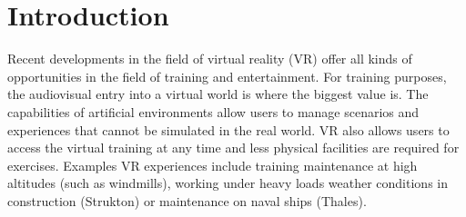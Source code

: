 \section{Introduction}
Recent developments in the field of virtual reality (VR) offer all kinds of opportunities in the field of training
and entertainment. For training purposes, the audiovisual entry into a virtual world is where the biggest value is.
The capabilities of artificial environments allow users to manage scenarios and 
experiences that cannot be simulated in the real world. VR also allows users to access the virtual training at any time
and less physical facilities are required for exercises. 
Examples VR experiences include training maintenance at high altitudes (such as windmills), working under heavy loads
weather conditions in construction (Strukton) or maintenance on naval ships (Thales).